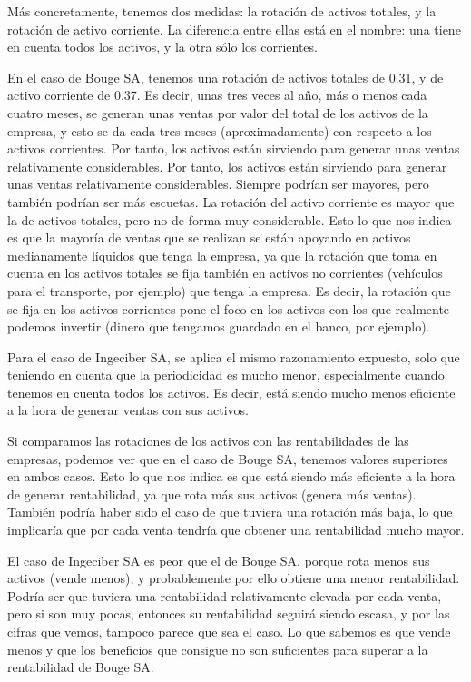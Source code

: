 \documentclass[a4paper]{article}
\begin{document}
Más concretamente, tenemos dos medidas: la rotación de activos totales, y la rotación de activo corriente. La diferencia entre ellas está en el nombre: una tiene en cuenta todos los activos, y la otra sólo los corrientes.

En el caso de Bouge SA, tenemos una rotación de activos totales de 0.31, y de activo corriente de 0.37. Es decir, unas tres veces al año, más o menos cada cuatro meses, se generan unas ventas por valor del total de los activos de la empresa, y esto se da cada tres meses (aproximadamente) con respecto a los activos corrientes. Por tanto, los activos están sirviendo para generar unas ventas relativamente considerables. Por tanto, los activos están sirviendo para generar unas ventas relativamente considerables. Siempre podrían ser mayores, pero también podrían ser más escuetas. La rotación del activo corriente es mayor que la de activos totales, pero no de forma muy considerable. Esto lo que nos indica es que la mayoría de ventas que se realizan se están apoyando en activos medianamente líquidos que tenga la empresa, ya que la rotación que toma en cuenta en los activos totales se fija también en activos no corrientes (vehículos para el transporte, por ejemplo) que tenga la empresa. Es decir, la rotación que se fija en los activos corrientes pone el foco en los activos con los que realmente podemos invertir (dinero que tengamos guardado en el banco, por ejemplo).

Para el caso de Ingeciber SA, se aplica el mismo razonamiento expuesto, solo que teniendo en cuenta que la periodicidad es mucho menor, especialmente cuando tenemos en cuenta todos los activos. Es decir, está siendo mucho menos eficiente a la hora de generar ventas con sus activos.

Si comparamos las rotaciones de los activos con las rentabilidades de las empresas, podemos ver que en el caso de Bouge SA, tenemos valores superiores en ambos casos. Esto lo que nos indica es que está siendo más eficiente a la hora de generar rentabilidad, ya que rota más sus activos (genera más ventas). También podría haber sido el caso de que tuviera una rotación más baja, lo que implicaría que por cada venta tendría que obtener una rentabilidad mucho mayor.

El caso de Ingeciber SA es peor que el de Bouge SA, porque rota menos sus activos (vende menos), y probablemente por ello obtiene una menor rentabilidad. Podría ser que tuviera una rentabilidad relativamente elevada por cada venta, pero si son muy pocas, entonces su rentabilidad seguirá siendo escasa, y por las cifras que vemos, tampoco parece que sea el caso. Lo que sabemos es que vende menos y que los beneficios que consigue no son suficientes para superar a la rentabilidad de Bouge SA.
\end{document}
